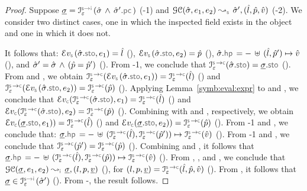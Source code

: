  \begin{proof}
 Suppose $\istate = \interpret{\symbinst}{\senv}(\sstate \, \wedge \, \sstate'.\pcsel)$ (\hyp{1}) 
 and $\absgetcellrule{\symbolic}{\sstate, \jsilexpr_1, \jsilexpr_2}{\sstate', (\sloc, \sexprp, \sexprv)}$ (\hyp{2}). 
 We consider two distinct cases, one in which the inspected field exists 
 in the object and one in which it does not. 
 \vspace{3pt} 
 
 \noindent {} It follows that:  $\evalexpr{\symbolic}(\sstate.\stosel, \jsilexpr_1) = \sloc$ (), 
 $\evalexpr{\symbolic}(\sstate.\stosel, \jsilexpr_2) = \sexprp$ (), 
 $\sstate.\hpsel = - \, \uplus \, (\sloc, \sexprp') \mapsto \sexprv$ (), and
 $\hat{\sigma}' = \hat{\sigma} \, \wedge \, (\hat{p} = \hat{p}')$  (). 
 From \hyp{1}, we conclude that $\interpret{\symbconc}{\senv}(\sstate.\stosel) = \istate.\stosel$ (). 
 From  and , we obtain 
 $\interpret{\symbconc}{\senv}(\evalexpr{\symbolic}(\sstate.\stosel, \jsilexpr_1))= \interpret{\symbconc}{\senv}(\sloc)$ () 
 and 
 $\interpret{\symbconc}{\senv}(\evalexpr{\symbolic}(\sstate.\stosel, \jsilexpr_2))= \interpret{\symbconc}{\senv}(\sexprp)$ (). 
 Applying Lemma~\ref{symb:eval:expr} to  and , we conclude that 
$\evalexpr{\concrete}(\interpret{\symbconc}{\senv}(\sstate.\stosel), \jsilexpr_1) = \interpret{\symbconc}{\senv}(\sloc)$ ()
and 
$\evalexpr{\concrete}(\interpret{\symbconc}{\senv}(\sstate.\stosel), \jsilexpr_2) = \interpret{\symbconc}{\senv}(\sexprp)$ (). 
Combining  with  and , respectively, we obtain
 $\evalexpr{\concrete}(\istate.\stosel, \jsilexpr_1)) = \interpret{\symbconc}{\senv}(\sloc)$ ()
and 
$\evalexpr{\concrete}(\istate.\stosel, \jsilexpr_2)) = \interpret{\symbconc}{\senv}(\sexprp)$ (). 
From \hyp{1} and , we conclude that: 
 $\istate.\hpsel = - \, \uplus \, (\interpret{\symbconc}{\senv}(\sloc), \interpret{\symbconc}{\senv}(\sexprp')) \mapsto \interpret{\symbconc}{\senv}(\sexprv)$ (). 
 From \hyp{1} and , we conclude that $\interpret{\symbconc}{\senv}(\sexprp') = \interpret{\symbconc}{\senv}(\sexprp)$ (). 
 Combining  and , it follows that 
 $\istate.\hpsel = - \, \uplus \, (\interpret{\symbconc}{\senv}(\sloc), \interpret{\symbconc}{\senv}(\sexprp)) \mapsto \interpret{\symbconc}{\senv}(\sexprv)$ (). 
 From , , and , we conclude that 
 $\absgetcellrule{\instrumented}{\istate, \jsilexpr_1, \jsilexpr_2}{\istate, (\loc, p, \ival)}$ (), 
 for $(\loc, p, \ival) =  \interpret{\symbconc}{\senv}(\sloc, \sexprp, \sexprv)$ (). 
 From , it follows that $\istate \in \interpret{\symbinst}{\senv}(\sstate')$ (). 
 From -, the result follows. 
 \vspace{3pt}
 

\end{proof}
